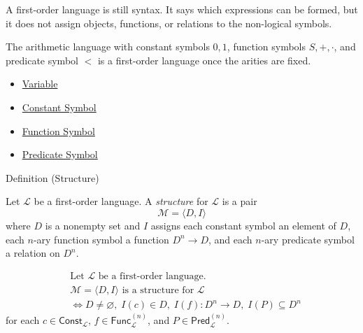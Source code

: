 \begin{remark*}[Interpretation]
A first-order language is still syntax. It says which expressions can be
formed, but it does not assign objects, functions, or relations to the
non-logical symbols.
\end{remark*}

\begin{remark*}[Examples]
The arithmetic language with constant symbols \(0,1\), function symbols
\(S,+,\cdot\), and predicate symbol \(<\) is a first-order language once the
arities are fixed.
\end{remark*}

\begin{dependencies}
\begin{itemize}
  \item \hyperref[def:variable]{Variable}
  \item \hyperref[def:constant-symbol]{Constant Symbol}
  \item \hyperref[def:function-symbol]{Function Symbol}
  \item \hyperref[def:predicate-symbol]{Predicate Symbol}
\end{itemize}
\end{dependencies}

\begin{definitionbox}{Definition (Structure)}
\begin{definition}[Structure]
\label{def:structure}
Let \(\mathcal L\) be a first-order language. A \emph{structure} for
\(\mathcal L\) is a pair
\[
\mathcal M=\langle D,I\rangle
\]
where \(D\) is a nonempty set and \(I\) assigns each constant symbol an element
of \(D\), each \(n\)-ary function symbol a function \(D^n\to D\), and each
\(n\)-ary predicate symbol a relation on \(D^n\).
\end{definition}
\end{definitionbox}

\begin{remark*}
\[
\begin{aligned}
&\text{Let } \mathcal L \text{ be a first-order language.}\\
&\mathcal M=\langle D,I\rangle \text{ is a structure for } \mathcal L\\
&\Longleftrightarrow
D\neq\varnothing,\;
I(c)\in D,\;
I(f):D^n\to D,\;
I(P)\subseteq D^n
\end{aligned}
\]
for each \(c\in\mathsf{Const}_{\mathcal L}\),
\(f\in\mathsf{Func}_{\mathcal L}^{(n)}\), and
\(P\in\mathsf{Pred}_{\mathcal L}^{(n)}\).
\end{remark*}

